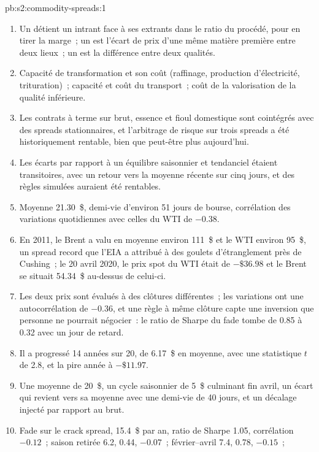 \begin{solution}{pb:s2:commodity-spreads:1}
\begin{enumerate}
\item Un  détient un intrant face à ses extrants dans le ratio du procédé, pour en tirer la marge~; un  est l'écart de prix d'une même
matière première entre deux lieux~; un  est la différence entre deux qualités.
\item Capacité de transformation et son coût (raffinage, production d'électricité, trituration)~; capacité et coût du transport~; coût de la valorisation de la qualité inférieure.
\item Les contrats à terme sur brut, essence et fioul domestique sont cointégrés avec des spreads stationnaires, et l'arbitrage de risque sur trois spreads a été historiquement
rentable, bien que peut-être plus aujourd'hui.
\item Les écarts par rapport à un équilibre saisonnier et tendanciel étaient transitoires, avec un retour vers la moyenne récente sur cinq jours, et des règles simulées auraient
été rentables.
\item Moyenne 21.30~\$, demi-vie d'environ 51 jours de bourse, corrélation des variations quotidiennes avec celles du WTI de $-0.38$.
\item En 2011, le Brent a valu en moyenne environ 111~\$ et le WTI environ 95~\$, un spread record que l'EIA a attribué à des goulets d'étranglement près de Cushing~; le 20 avril 2020, le prix spot du WTI
était de $-\$36.98$ et le Brent se situait 54.34~\$ au-dessus de celui-ci.
\item Les deux prix sont évalués à des clôtures différentes~; les variations ont une autocorrélation de $-0.36$, et une règle à même clôture capte une inversion que
personne ne pourrait négocier~: le ratio de Sharpe du fade tombe de 0.85 à 0.32 avec un jour de retard.
\item Il a progressé 14 années sur 20, de 6.17~\$ en moyenne, avec une statistique $t$ de 2.8, et la pire année à $-\$11.97$.
\item Une moyenne de 20~\$, un cycle saisonnier de 5~\$ culminant fin avril, un écart qui revient vers sa moyenne avec une demi-vie de 40 jours, et un décalage injecté par rapport au brut.
\item Fade sur le crack spread, 15.4~\$ par an, ratio de Sharpe 1.05, corrélation $-0.12$~; saison retirée 6.2, 0.44, $-0.07$~; février--avril 7.4, 0.78, $-0.15$~;

\end{enumerate}
\end{solution}
